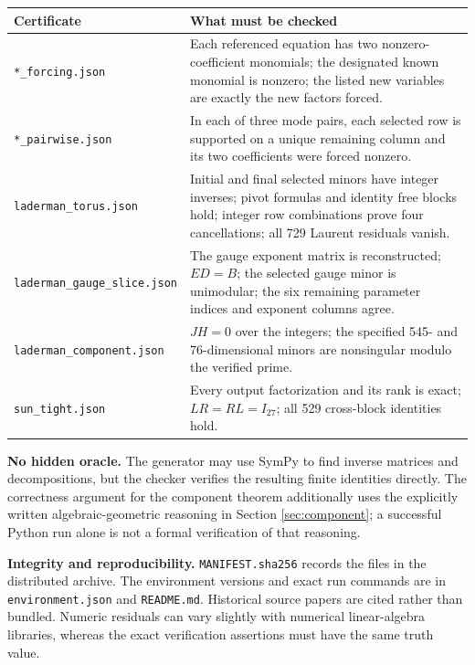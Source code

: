\documentclass[11pt,letterpaper]{article}
\theoremstyle{definition}\newtheorem{definition}[theorem]{Definition}
\theoremstyle{remark}\newtheorem{remark}[theorem]{Remark}
\newcommand{\file}[1]{\nolinkurl{#1}}
\begin{document}
\begin{longtable}{p{}p{}}
\toprule
Certificate & What must be checked \\
\midrule\endhead
\file{*_forcing.json} & Each referenced equation has two nonzero-coefficient monomials; the designated known monomial is nonzero; the listed new variables are exactly the new factors forced. \\
\file{*_pairwise.json} & In each of three mode pairs, each selected row is supported on a unique remaining column and its two coefficients were forced nonzero. \\
\file{laderman_torus.json} & Initial and final selected minors have integer inverses; pivot formulas and identity free blocks hold; integer row combinations prove four cancellations; all 729 Laurent residuals vanish. \\
\file{laderman_gauge_slice.json} & The gauge exponent matrix is reconstructed; $ED=B$; the selected gauge minor is unimodular; the six remaining parameter indices and exponent columns agree. \\
\file{laderman_component.json} & $JH=0$ over the integers; the specified 545- and 76-dimensional minors are nonsingular modulo the verified prime. \\
\file{sun_tight.json} & Every output factorization and its rank is exact; $LR=RL=I_{27}$; all 529 cross-block identities hold. \\
\bottomrule
\end{longtable}

\textbf{No hidden oracle.} The generator may use SymPy to find inverse
matrices and decompositions, but the checker verifies the resulting
finite identities directly. The correctness argument for the component
theorem additionally uses the explicitly written algebraic-geometric
reasoning in Section \ref{sec:component}; a successful Python run alone
is not a formal verification of that reasoning.

\textbf{Integrity and reproducibility.} \file{MANIFEST.sha256} records the
files in the distributed archive. The environment versions and exact
run commands are in \file{environment.json} and \file{README.md}.
Historical source papers are cited rather than bundled. Numeric residuals
can vary slightly with numerical linear-algebra libraries, whereas the
exact verification assertions must have the same truth value.
\end{document}

